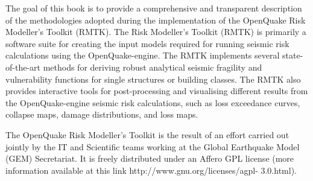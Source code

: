 The goal of this book is to provide a comprehensive and transparent description of the methodologies adopted during the implementation of the OpenQuake Risk Modeller's Toolkit (RMTK). The Risk Modeller's Toolkit (RMTK) is primarily a software suite for creating the input models required for running seismic risk calculations using the OpenQuake-engine. The RMTK implements several state-of-the-art methods for deriving robust analytical seismic fragility and vulnerability functions for single structures or building classes. The RMTK also provides interactive tools for post-processing and visualising different results from the OpenQuake-engine seismic risk calculations, such as loss exceedance curves, collapse maps, damage distributions, and loss maps.

The OpenQuake Risk Modeller's Toolkit is the result of an effort carried out jointly by the IT and Scientific teams working at the Global Earthquake Model (GEM) Secretariat. It is freely distributed under an Affero GPL license (more information available at this link http://www.gnu.org/licenses/agpl- 3.0.html).